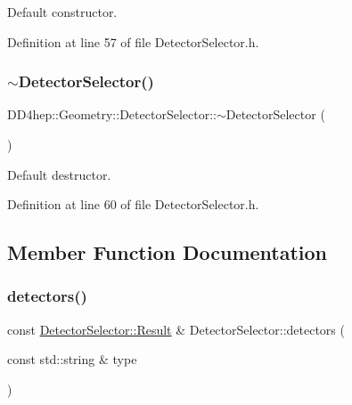 Default constructor. 



Definition at line 57 of file Detector\+Selector.\+h.

\hypertarget{class_d_d4hep_1_1_geometry_1_1_detector_selector_a20dcfab3e2fb33672b347aa4fdcea393}{}\label{class_d_d4hep_1_1_geometry_1_1_detector_selector_a20dcfab3e2fb33672b347aa4fdcea393} 
\subsubsection{\texorpdfstring{$\sim$\+Detector\+Selector()}{~DetectorSelector()}}
{\footnotesize\ttfamily D\+D4hep\+::\+Geometry\+::\+Detector\+Selector\+::$\sim$\+Detector\+Selector (\begin{DoxyParamCaption}{ }\end{DoxyParamCaption})\hspace{0.3cm}{\ttfamily [inline]}}



Default destructor. 



Definition at line 60 of file Detector\+Selector.\+h.



\subsection{Member Function Documentation}
\hypertarget{class_d_d4hep_1_1_geometry_1_1_detector_selector_a81f9787f4e1d4a0ce5ba2f5cd379b7c5}{}\label{class_d_d4hep_1_1_geometry_1_1_detector_selector_a81f9787f4e1d4a0ce5ba2f5cd379b7c5} 
\subsubsection{\texorpdfstring{detectors()}{detectors()}\hspace{0.1cm}{\footnotesize\ttfamily [1/3]}}
{\footnotesize\ttfamily const \hyperlink{class_d_d4hep_1_1_geometry_1_1_detector_selector_a6ce0dfe8c83f5d36138244218f260ed1}{Detector\+Selector\+::\+Result} \& Detector\+Selector\+::detectors (\begin{DoxyParamCaption}\item[{const std\+::string \&}]{type }\end{DoxyParamCaption})}




